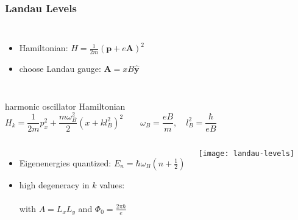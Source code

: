 \begin{frame}
\frametitle{Landau Levels}

	\begin{columns}
	\column[]{12.5cm}
	\begin{itemize}

	\item Hamiltonian: $H = \frac{1}{2m}\left(\boldsymbol{p}+e\boldsymbol{A}\right)^2$
	
	\item choose Landau gauge: $\boldsymbol{A} = xB\boldsymbol{\hat{y}}$
	\pause
	\end{itemize}
	\end{columns}
	\begin{block}{harmonic oscillator Hamiltonian}
		\centering$H_k = \dfrac{1}{2m}p_x^2 + \dfrac{m\omega_B^2}{2}\left(x+kl_B^2\right)^2 \quad \quad \omega_B = \dfrac{eB}{m}, \quad l_B^2 = \dfrac{\hbar}{eB}$
	\end{block}
		
	
	\pause
	\begin{columns}
	\column{8cm}
	\begin{itemize}
	\item Eigenenergies quantized: $E_n = \hbar \omega_B \left(n +\frac{1}{2}\right)$\\
	\item high \alert{degeneracy} in $k$ values:\\ \qquad 
	\\ with $A=L_xL_y$ and $\Phi_0 = \frac{2\pi\hbar}{e}$\\
	\end{itemize}
	\column[]{4cm}
	\centering
	\texttt{[image: landau-levels]}
	
	

	\end{columns}
\end{frame}


